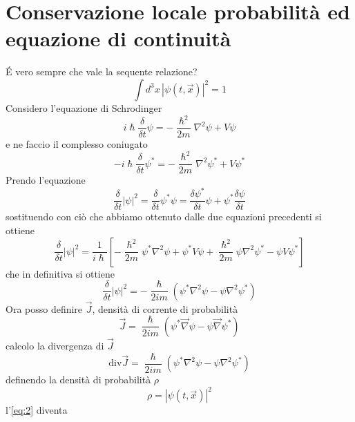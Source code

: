 \documentclass[a4paper,11pt]{report}
\theoremstyle{remark}
\theoremstyle{definition}
\begin{document}
\chapter{Conservazione locale probabilità ed equazione di continuità}

\'E vero sempre che vale la sequente relazione?
\begin{equation*}
    \int d^3x \, {|\psi(t,\vec{x})|}^2 = 1
\end{equation*}
Considero l'equazione di Schrodinger 
\begin{equation*}
    i\hslash \frac{\delta}{\delta t} \psi = -\frac{\hslash^2}{2m}\nabla^2 \psi + V\psi
\end{equation*}
e ne faccio il complesso coniugato
\begin{equation*}
    -i\hslash \frac{\delta}{\delta t} \psi^* = -\frac{\hslash^2}{2m}\nabla^2 \psi^* + V\psi^*
\end{equation*}
Prendo l'equazione 
\begin{equation*}
    \frac{\delta}{\delta t}{|\psi|}^2 = \frac{\delta}{\delta t} \psi^*\psi = \frac{\delta \psi^*}{\delta t}\psi + \psi^* \frac{\delta \psi}{\delta t}
\end{equation*}
sostituendo con ciò che abbiamo ottenuto dalle due equazioni precedenti si ottiene 
\begin{equation*}
    \frac{\delta}{\delta t}{|\psi|}^2 = \frac{1}{i\hslash} \left[-\frac{\hslash^2}{2m} \psi^* \nabla^2 \psi + \psi^*V\psi +\frac{\hslash^2}{2m} \psi\nabla^2\psi^* - \psi V\psi^* \right] 
\end{equation*}
che in definitiva si ottiene 
\begin{equation}
    \label{eq:2}
    \frac{\delta}{\delta t}{|\psi|}^2 = -\frac{\hslash}{2im} (\psi^*\nabla^2\psi - \psi\nabla^2\psi^*)
\end{equation}
Ora posso definire $\vec{J}$, densità di corrente di probabilità
\begin{equation*}
    \vec{J} = \frac{\hslash}{2im} (\psi^* \vec{\nabla} \psi - \psi \vec{\nabla}\psi^*)
\end{equation*}
calcolo la divergenza di $\vec{J}$
\begin{equation*}
    \mbox{div}\vec{J} = \frac{\hslash}{2im} (\psi^*\nabla^2\psi - \psi\nabla^2\psi^*)
\end{equation*}
definendo la densità di probabilità $\rho$
\begin{equation*}
    \rho = {|\psi(t,\vec{x})|}^2
\end{equation*}
l'\autoref{eq:2} diventa
\end{document}
